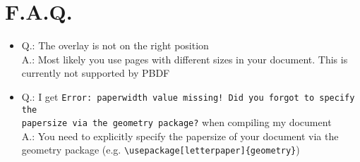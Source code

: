 \documentclass[11pt]{scrartcl}
\begin{document}
\newpage
\section{F.A.Q.}
\begin{itemize}
\item Q.: The overlay is not on the right position \\
A.: Most likely you use pages with different sizes in your document. This is currently not supported by PBDF 
\item Q.: I get \verb|Error: paperwidth value missing! Did you forgot to specify the| \\ \verb|papersize via the geometry package?| when compiling my document \\
A.: You need to explicitly specify the papersize of your document via the geometry package (e.g. \verb|\usepackage[letterpaper]{geometry}|)
\end{itemize}
\end{document}
